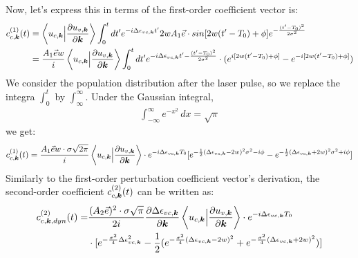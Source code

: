 Now, let's express this in terms of the first-order coefficient vector is:
\begin{equation}
\begin{aligned}
     c^{(1)}_{c,\boldsymbol k}(t) &= \left \langle u_{c,\boldsymbol k}\Big |\frac{\partial u_{v,\boldsymbol k}}{\partial \boldsymbol k} \right \rangle \int_0^t dt' e^{-i \Delta \epsilon_{vc,\boldsymbol k}t'} 
      2wA_1 \vec e \cdot sin[2w(t'-T_0)+\phi]  e^{-\frac{(t'-T_0)^2}{2\sigma^2}}\\
      &=\frac{A_1 \vec e w}{i} \left \langle u_{c,\boldsymbol k}\Big |\frac{\partial u_{v,\boldsymbol k}}{\partial \boldsymbol k} \right \rangle \int_0^t dt' e^{-i \Delta \epsilon_{vc,\boldsymbol k}t' - \frac{(t'-T_0)^2}{2\sigma^2}} 
      \cdot (e^{i[2w(t'-T_0)+\phi]}-e^{-i[2w(t'-T_0)+\phi]}) 
\end{aligned}
\end{equation}
We consider the population distribution after the laser pulse, so we replace the integra $\int_0^t$ by $\int_\infty^\infty$. Under the Gaussian integral, 
\begin{align}
\int_{-\infty}^{\infty} e^{-x^2} \, dx = \sqrt{\pi}
\end{align}
we get:
\begin{equation}
\begin{aligned}
     c^{(1)}_{c,\boldsymbol k}(t) = \frac{A_1 \vec e w \cdot \sigma \sqrt{2\pi}}{i} \left \langle u_{c,\boldsymbol k}\Big |\frac{\partial u_{v,\boldsymbol k}}{\partial \boldsymbol k} \right \rangle \cdot  e^{-i\Delta \epsilon_{vc,\boldsymbol k} T_0}
    [e^{-\frac{1}{2}(\Delta \epsilon_{vc,\boldsymbol k} - 2w)^2 \sigma^2-i\phi}
    -e^{-\frac{1}{2}(\Delta \epsilon_{vc,\boldsymbol k} + 2w)^2 \sigma^2+i\phi}]
\end{aligned}
\end{equation}
Similarly to the first-order perturbation coefficient vector's derivation, the second-order coefficient $c^{(2)}_{c,\boldsymbol k}(t)$ can be written as:
\begin{equation}
\begin{aligned}
    c^{(2)}_{c,\boldsymbol k,dyn}(t)=&\frac{(A_2 \vec e)^2 \cdot \sigma \sqrt{\pi}}{2i} \frac{\partial
    \Delta \epsilon_{vc,\boldsymbol k}}{\partial \boldsymbol k} \left \langle u_{c,\boldsymbol k}\Big |\frac{\partial
u_{v,\boldsymbol k}}{\partial \boldsymbol k} \right \rangle \cdot e^{-i\Delta \epsilon_{vc,\boldsymbol k} T_0}\\
    &\cdot [e^{-\frac{\sigma^2}{4} \Delta \epsilon_{vc,\boldsymbol k} ^2}-\frac{1}{2}(e^{-\frac{\sigma^2}{4} (\Delta \epsilon_{vc,\boldsymbol k}-2w)^2}+e^{-\frac{\sigma^2}{4} (\Delta \epsilon_{vc,\boldsymbol k}+2w)^2})]
\end{aligned}
\end{equation}

